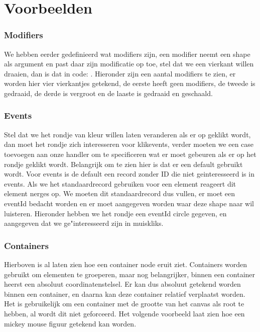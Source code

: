 \section{Voorbeelden}
\subsubsection{Modifiers}
We hebben eerder gedefinieerd wat modifiers zijn, een modifier neemt een shape als argument en past daar zijn modificatie op toe, stel dat we een vierkant willen draaien, dan is dat in code: . Hieronder zijn een aantal modifiers te zien, er worden hier vier vierkantjes getekend, de eerste heeft geen modifiers, de tweede is gedraaid, de derde is vergroot en de laaste is gedraaid en geschaald.




\subsubsection{Events}
Stel dat we het rondje van kleur willen laten veranderen als er op geklikt wordt, dan moet het rondje zich interesseren voor klikevents, verder moeten we een case toevoegen aan onze handler om te specificeren wat er moet gebeuren als er op het rondje geklikt wordt. Belangrijk om te zien hier is dat er een default gebruikt wordt. Voor events is de default een record zonder ID die niet geinteresseerd is in events. Als we het standaardrecord gebruiken voor een element reageert dit element nerges op. We moeten dit standaardrecord dus vullen, er moet een eventId bedacht worden en er moet aangegeven worden waar deze shape naar wil luisteren. Hieronder hebben we het rondje een eventId circle gegeven, en aangegeven dat we ge"interesseerd zijn in muiskliks.



\subsubsection{Containers}
Hierboven is al laten zien hoe een container node eruit ziet. Containers worden gebruikt om elementen te groeperen, maar nog belangrijker, binnen een container heerst een absoluut coordinatenstelsel. Er kan dus absoluut getekend worden binnen een container, en daarna kan deze container relatief verplaatst worden. Het is gebruikelijk om een container met de grootte van het canvas als root te hebben, al wordt dit niet geforceerd. Het volgende voorbeeld laat zien hoe een mickey mouse figuur getekend kan worden.

